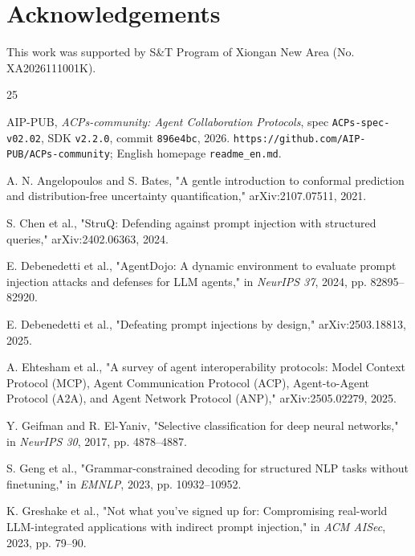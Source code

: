 \documentclass[runningheads,a4paper]{llncs}
\begin{document}
\section*{Acknowledgements}

This work was supported by S\&T Program of Xiongan New Area (No. XA2026111001K).

\begin{thebibliography}{25}

\small

\setlength{\itemsep}{0pt}

\setlength{\parskip}{0pt}

 AIP-PUB, \emph{ACPs-community: Agent Collaboration Protocols}, spec \texttt{ACPs-spe\allowbreak{}c-v02.02}, SDK \texttt{v2.2.0}, commit \texttt{896e4bc}, 2026. \texttt{https:/\allowbreak{}/\allowbreak{}github.com/\allowbreak{}AIP-PUB/\allowbreak{}ACPs-community}; English homepage \texttt{readme\_\allowbreak{}en.md}.

 A. N. Angelopoulos and S. Bates, "A gentle introduction to conformal prediction and distribution-free uncertainty quantification," arXiv:2107.07511, 2021.

 S. Chen et al., "StruQ: Defending against prompt injection with structured queries," arXiv:2402.06363, 2024.

 E. Debenedetti et al., "AgentDojo: A dynamic environment to evaluate prompt injection attacks and defenses for LLM agents," in \emph{NeurIPS 37}, 2024, pp. 82895--82920.

 E. Debenedetti et al., "Defeating prompt injections by design," arXiv:2503.18813, 2025.

 A. Ehtesham et al., "A survey of agent interoperability protocols: Model Context Protocol (MCP), Agent Communication Protocol (ACP), Agent-to-Agent Protocol (A2A), and Agent Network Protocol (ANP)," arXiv:2505.02279, 2025.

 Y. Geifman and R. El-Yaniv, "Selective classification for deep neural networks," in \emph{NeurIPS 30}, 2017, pp. 4878--4887.

 S. Geng et al., "Grammar-constrained decoding for structured NLP tasks without finetuning," in \emph{EMNLP}, 2023, pp. 10932--10952.

 K. Greshake et al., "Not what you've signed up for: Compromising real-world LLM-integrated applications with indirect prompt injection," in \emph{ACM AISec}, 2023, pp. 79--90.


\end{thebibliography}
\end{document}
